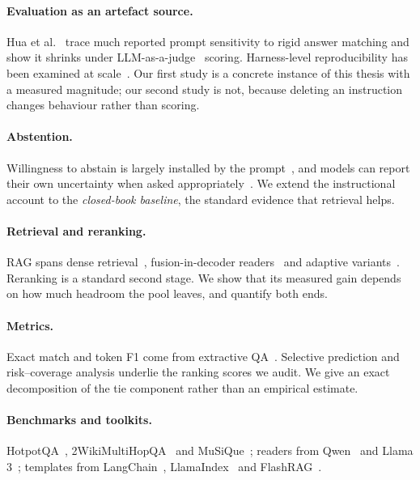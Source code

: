 ﻿\documentclass[11pt]{article}
\begin{document}
\paragraph{Evaluation as an artefact source.}
Hua et al.~\cite{hua2025flaw} trace much reported prompt sensitivity to rigid answer matching
and show it shrinks under LLM-as-a-judge~\cite{zheng2023judging} scoring. Harness-level
reproducibility has been examined at
scale~\cite{liang2023helm,biderman2024lessons}. Our first study is a concrete instance of this
thesis with a measured magnitude; our second study is not, because deleting an instruction
changes behaviour rather than scoring.

\paragraph{Abstention.}
Willingness to abstain is largely installed by the
prompt~\cite{abstention2025}, and models can report their own uncertainty when asked
appropriately~\cite{kadavath2022language,kuhn2023semantic,farquhar2024detecting}. We extend the
instructional account to the \emph{closed-book baseline}, the standard evidence that retrieval
helps.

\paragraph{Retrieval and reranking.}
RAG spans dense retrieval~\cite{karpukhin2020dense}, fusion-in-decoder
readers~\cite{izacard2021leveraging} and adaptive variants~\cite{asai2024selfrag,jiang2023flare}.
Reranking is a standard second stage. We show that its measured gain depends on how much
headroom the pool leaves, and quantify both ends.

\paragraph{Metrics.}
Exact match and token F1 come from extractive QA~\cite{rajpurkar2016squad}. Selective
prediction and risk--coverage analysis underlie the ranking scores we audit. We give an exact
decomposition of the tie component rather than an empirical estimate.

\paragraph{Benchmarks and toolkits.}
HotpotQA~\cite{yang2018hotpotqa}, 2WikiMultiHopQA~\cite{ho2020} and
MuSiQue~\cite{trivedi2022musique}; readers from Qwen~\cite{qwen2024} and Llama
3~\cite{llama3}; templates from LangChain~\cite{langchain}, LlamaIndex~\cite{llamaindex} and
FlashRAG~\cite{flashrag2025}.
\end{document}
